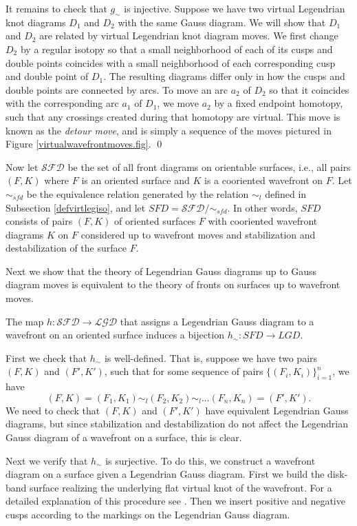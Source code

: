 It remains to check that $g_\sim$ is injective.  Suppose we have two virtual Legendrian knot diagrams $D_1$ and $D_2$ with the same Gauss diagram.  We will show that $D_1$ and $D_2$ are related by virtual Legendrian knot diagram moves.  We first change $D_2$ by a regular isotopy so that a small neighborhood of each of its cusps and double points coincides with a small neighborhood of each corresponding cusp and double point of $D_1$.  The resulting diagrams differ only in how the cusps and double points are connected by arcs.  To move an arc $a_2$ of $D_2$ so that it coincides with the corresponding arc $a_1$ of $D_1$, we move $a_2$ by a fixed endpoint homotopy, such that any crossings created during that homotopy are virtual.  This move is known as the {\it detour move}, and is simply a sequence of the moves pictured in Figure \ref{virtualwavefrontmoves.fig}. 
\qed

Now let $\mathcal{SFD}$ be the set of all front diagrams on orientable surfaces, i.e., all pairs $(F,K)$ where $F$  is an oriented surface and $K$ is a cooriented wavefront on $F$.  Let $\sim_{sfd}$ be the equivalence relation generated by the relation $\sim_l$ defined in Subsection \ref{defvirtlegiso}, and let $SFD=\mathcal{SFD}/\sim_{sfd}$.  In other words, $SFD$ consists of pairs $(F,K)$ of oriented surfaces $F$ with cooriented wavefront diagrams $K$ on $F$ considered up to wavefront moves and stabilization and destabilization of the surface $F$.

Next we show that the theory of Legendrian Gauss diagrams up to Gauss diagram moves is equivalent to the theory of fronts on surfaces up to wavefront moves.
\begin{thm} The map $h: \mathcal{SFD}\rightarrow \mathcal{LGD}$ that assigns a Legendrian Gauss diagram to a wavefront on an oriented surface induces a bijection $h_\sim : SFD \rightarrow LGD$.
\end{thm}
\pp  First we check that $h_\sim$ is well-defined.  That is, suppose we have two pairs $(F,K)$ and $(F', K')$, such that for some sequence of pairs $\{(F_i,K_i)\}_{i=1}^n$, we have
$$(F,K)=(F_1,K_1)\sim_l (F_2,K_2)\sim_l \dots (F_n, K_n)=(F',K').$$
We need to check that $(F,K)$ and $(F',K')$ have equivalent Legendrian Gauss diagrams, but since stabilization and destabilization do not affect the Legendrian Gauss diagram of a wavefront on a surface, this is clear.

Next we verify that $h_\sim$ is surjective.  To do this, we construct a wavefront diagram on a surface given a Legendrian Gauss diagram.   First we build the disk-band surface realizing the underlying flat virtual knot of the wavefront.  For a detailed explanation of this procedure see \cite{Turaev}.  Then we insert positive and negative cusps according to the markings on the Legendrian Gauss diagram.

